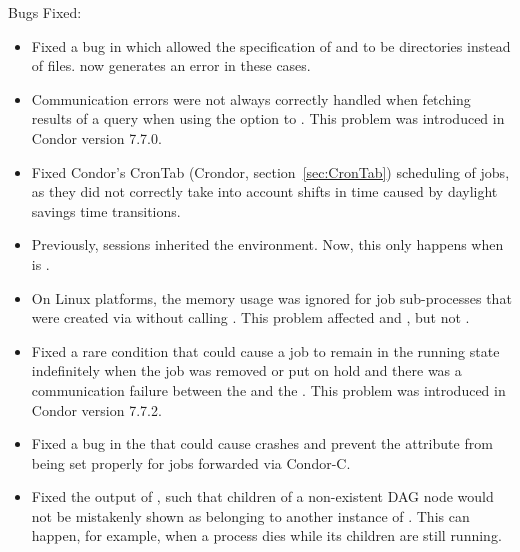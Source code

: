 \noindent Bugs Fixed:

\begin{itemize}

\item Fixed a bug in which  allowed the specification of
 and 
to be directories instead of files.
 now generates an error in these cases.

\item Communication errors were not always correctly handled when
fetching results of a query when using the  option to
.  This problem was introduced in Condor version 7.7.0.

\item Fixed Condor's CronTab (Crondor, section~\ref{sec:CronTab})
scheduling of jobs,
as they did not correctly take into account
shifts in time caused by daylight savings time transitions.

\item Previously,  sessions inherited the 
environment.  Now, this only happens when
 is .

\item On Linux platforms, the memory usage was ignored for job sub-processes
that were created via  without calling .
This problem affected  and ,
but not .

\item Fixed a rare condition that could cause a job to remain in the
running state indefinitely when the job was removed or put on hold
and there was a communication failure between the 
and the .  
This problem was introduced in Condor version 7.7.2.

\item Fixed a bug in the  that could cause crashes
and prevent the attribute  from being set properly for
jobs forwarded via Condor-C.

\item Fixed the output of  ,
such that children of a non-existent DAG node would not be mistakenly 
shown as belonging to another instance of .
This can happen, for example, when a  process dies while
its children are still running.


\end{itemize}

